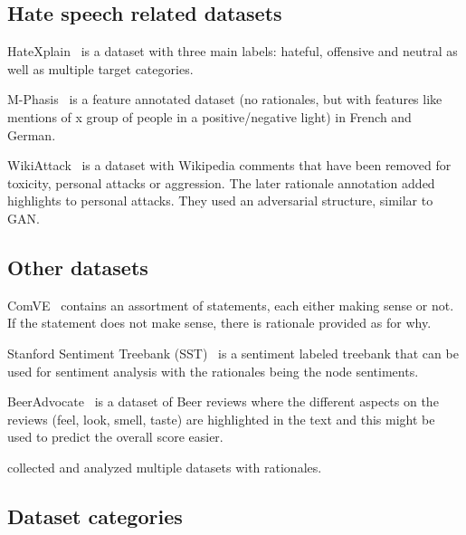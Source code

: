 \documentclass[]{article}
\begin{document}
\subsection{Hate speech related datasets}

HateXplain~\cite{Mathew:2021} is a dataset with three main labels: hateful, offensive and neutral as well as multiple target categories.

M-Phasis~\cite{Ruiter:2022} is a feature annotated dataset (no rationales, but with features like mentions of x group of people in a positive/negative light) in French and German.

WikiAttack~\cite{Carton:2018} is a dataset with Wikipedia comments that have been removed for toxicity, personal attacks or aggression. The later rationale annotation added highlights to personal attacks. They used an adversarial structure, similar to GAN.

\subsection{Other datasets}

ComVE~\cite{Wang:2019} contains an assortment of statements, each either making sense or not. If the statement does not make sense, there is rationale provided as for why.

Stanford Sentiment Treebank (SST)~\cite{Socher:2013} is a sentiment labeled treebank that can be used for sentiment analysis with the rationales being the node sentiments.

BeerAdvocate~\cite{McAuley:2012} is a dataset of Beer reviews where the different aspects on the reviews (feel, look, smell, taste) are highlighted in the text and this might be used to predict the overall score easier.

\cite{Wiegreffe:2021} collected and analyzed multiple datasets with rationales.

\clearpage

\subsection{Dataset categories}
\end{document}

